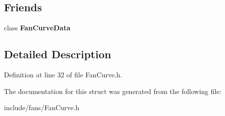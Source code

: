 \subsection*{Friends}
\begin{DoxyCompactItemize}
\item 
\mbox{\label{struct_fan_curve_data_1_1_base_curve_a84779ae1f4b93a96435593980fe1445b}} 
class {\bfseries Fan\+Curve\+Data}
\end{DoxyCompactItemize}


\subsection{Detailed Description}


Definition at line 32 of file Fan\+Curve.\+h.



The documentation for this struct was generated from the following file\+:\begin{DoxyCompactItemize}
\item 
include/fans/Fan\+Curve.\+h\end{DoxyCompactItemize}
